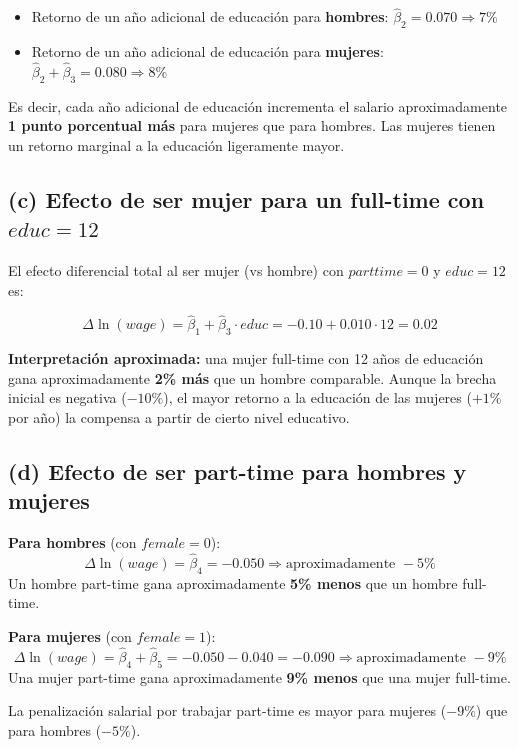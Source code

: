 \documentclass[11pt,a4paper]{article}
\begin{document}
\begin{itemize}[leftmargin=2em]
    \item Retorno de un año adicional de educación para \textbf{hombres}: \(\hat{\beta}_2 = 0.070 \Rightarrow 7\%\)
    \item Retorno de un año adicional de educación para \textbf{mujeres}: \(\hat{\beta}_2 + \hat{\beta}_3 = 0.080 \Rightarrow 8\%\)
\end{itemize}

Es decir, cada año adicional de educación incrementa el salario aproximadamente \textbf{1 punto porcentual más} para mujeres que para hombres. Las mujeres tienen un retorno marginal a la educación ligeramente mayor.

\subsection*{(c) Efecto de ser mujer para un full-time con \(educ=12\)}

El efecto diferencial total al ser mujer (vs hombre) con \(parttime=0\) y \(educ=12\) es:

\[
\Delta \ln(wage) = \hat{\beta}_1 + \hat{\beta}_3 \cdot educ = -0.10 + 0.010 \cdot 12 = 0.02
\]

\begin{conclusion}
\textbf{Interpretación aproximada:} una mujer full-time con 12 años de educación gana aproximadamente \textbf{2\% más} que un hombre comparable. Aunque la brecha inicial es negativa (\(-10\%\)), el mayor retorno a la educación de las mujeres (\(+1\%\) por año) la compensa a partir de cierto nivel educativo.
\end{conclusion}

\subsection*{(d) Efecto de ser part-time para hombres y mujeres}

\textbf{Para hombres} (con \(female=0\)):
\[
\Delta \ln(wage) = \hat{\beta}_4 = -0.050 \Rightarrow \text{aproximadamente } -5\%
\]
Un hombre part-time gana aproximadamente \textbf{5\% menos} que un hombre full-time.

\textbf{Para mujeres} (con \(female=1\)):
\[
\Delta \ln(wage) = \hat{\beta}_4 + \hat{\beta}_5 = -0.050 - 0.040 = -0.090 \Rightarrow \text{aproximadamente } -9\%
\]
Una mujer part-time gana aproximadamente \textbf{9\% menos} que una mujer full-time.

\begin{conclusion}
La penalización salarial por trabajar part-time es mayor para mujeres (\(-9\%\)) que para hombres (\(-5\%\)).
\end{conclusion}
\end{document}

